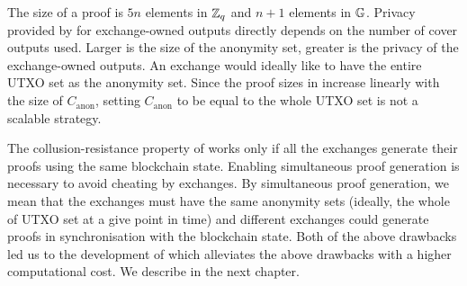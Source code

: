 The size of a \R proof is $5n$ elements in $\mathbb{Z}_q$ and $n+1$ elements in $\mathbb{G}$.
Privacy provided by \R for exchange-owned outputs directly depends on the number of cover outputs used.
Larger is the size of the anonymity set, greater is the privacy of the exchange-owned outputs.
An exchange would ideally like to have the entire UTXO set as the anonymity set. 
Since the proof sizes in \R increase linearly
with the size of $C_{\text{anon}}$, setting $C_{\text{anon}}$ to be equal
to the whole UTXO set is not a scalable strategy.

The collusion-resistance property of \R works only
if all the exchanges generate their proofs using the same
blockchain state.
Enabling simultaneous proof generation is necessary to avoid cheating by exchanges.
By simultaneous proof generation, we mean that the exchanges must have the same anonymity sets (ideally, the whole of UTXO set at a give point in time)
and different exchanges could generate proofs in synchronisation with the blockchain state.
Both of the above drawbacks led us to the development of \RB which alleviates the above drawbacks with a higher computational cost.
We describe \RB in the next chapter. 